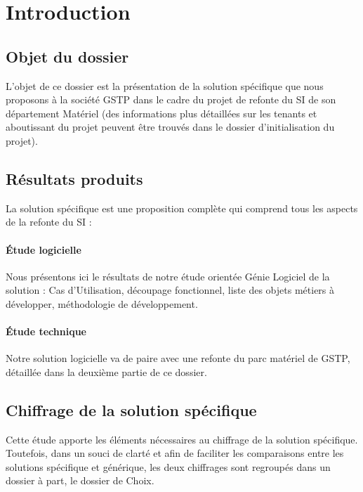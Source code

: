 \section{Introduction}


\subsection{Objet du dossier}

L'objet de ce dossier est la présentation de la solution spécifique que
nous proposons à la société GSTP dans le cadre du projet de refonte du SI
de son département Matériel (des informations plus détaillées sur les
tenants et aboutissant du projet peuvent être trouvés dans le dossier
d'initialisation du projet).


\subsection{Résultats produits}

La solution spécifique est une proposition complète qui comprend tous les
aspects de la refonte du SI :

\paragraph{Étude logicielle}\hfill
Nous présentons ici le résultats de notre étude orientée Génie Logiciel de
la solution : Cas d'Utilisation, découpage fonctionnel, liste des objets
métiers à développer, méthodologie de développement.

\paragraph{Étude technique}\hfill
Notre solution logicielle va de paire avec une refonte du parc matériel de
GSTP, détaillée dans la deuxième partie de ce dossier.


\subsection{Chiffrage de la solution spécifique}

Cette étude apporte les éléments nécessaires au chiffrage de la solution
spécifique. Toutefois, dans un souci de clarté et afin de faciliter les
comparaisons entre les solutions spécifique et générique, les deux
chiffrages sont regroupés dans un dossier à part, le dossier de Choix.
